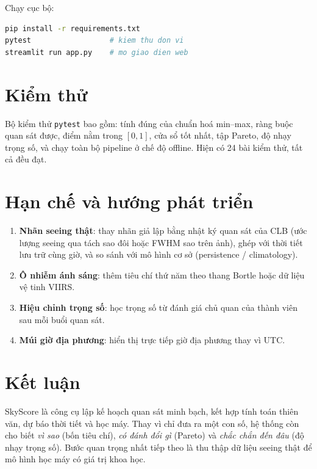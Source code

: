 \documentclass[12pt,a4paper]{article}
\begin{document}
Chạy cục bộ:
\begin{lstlisting}[language=bash]
pip install -r requirements.txt
pytest                  # kiem thu don vi
streamlit run app.py    # mo giao dien web
\end{lstlisting}

\section{Kiểm thử}
Bộ kiểm thử \texttt{pytest} bao gồm: tính đúng của chuẩn hoá min--max, ràng buộc quan sát
được, điểm nằm trong $[0,1]$, cửa sổ tốt nhất, tập Pareto, độ nhạy trọng số, và chạy toàn bộ
pipeline ở chế độ offline. Hiện có 24 bài kiểm thử, tất cả đều đạt.

\section{Hạn chế và hướng phát triển}
\begin{enumerate}[nosep]
  \item \textbf{Nhãn seeing thật}: thay nhãn giả lập bằng nhật ký quan sát của CLB (ước lượng
        seeing qua tách sao đôi hoặc FWHM sao trên ảnh), ghép với thời tiết lưu trữ cùng giờ,
        và so sánh với mô hình cơ sở (persistence / climatology).
  \item \textbf{Ô nhiễm ánh sáng}: thêm tiêu chí thứ năm theo thang Bortle hoặc dữ liệu vệ tinh VIIRS.
  \item \textbf{Hiệu chỉnh trọng số}: học trọng số từ đánh giá chủ quan của thành viên sau mỗi buổi quan sát.
  \item \textbf{Múi giờ địa phương}: hiển thị trực tiếp giờ địa phương thay vì UTC.
\end{enumerate}

\section{Kết luận}
SkyScore là công cụ lập kế hoạch quan sát minh bạch, kết hợp tính toán thiên văn, dự báo thời
tiết và học máy. Thay vì chỉ đưa ra một con số, hệ thống còn cho biết \emph{vì sao} (bốn tiêu
chí), \emph{có đánh đổi gì} (Pareto) và \emph{chắc chắn đến đâu} (độ nhạy trọng số). Bước quan
trọng nhất tiếp theo là thu thập dữ liệu seeing thật để mô hình học máy có giá trị khoa học.
\end{document}
